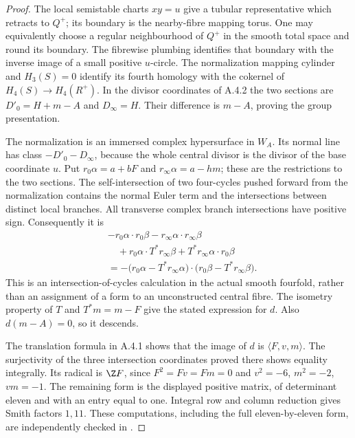 \begin{proof}
The local semistable charts $xy=u$ give a tubular representative which
retracts to $Q^+$; its boundary is the nearby-fibre mapping torus. One
may equivalently choose a regular neighbourhood of $Q^+$ in the smooth
total space and round its boundary. The fibrewise plumbing identifies
that boundary with the inverse image of a small positive $u$-circle.
The normalization mapping cylinder and $H_3(S)=0$ identify its fourth
homology with the cokernel of
$H_4(S)\to H_4(R^+)$. In the divisor coordinates of A.4.2 the two
sections are $D'_0=H+m-A$ and $D_\infty=H$. Their difference is
$m-A$, proving the group presentation.

The normalization is an immersed complex hypersurface in $W_A$.
Its normal line has class $-D'_0-D_\infty$, because the whole central
divisor is the divisor of the base coordinate $u$. Put
$r_0\alpha=a+bF$ and $r_\infty\alpha=a-hm$; these are the
restrictions to the two sections. The self-intersection of two
four-cycles pushed forward from the normalization contains the normal
Euler term and the intersections between distinct local branches.
All transverse complex branch intersections have positive sign.
Consequently it is
\begin{align*}
 &-r_0\alpha\cdot r_0\beta-r_\infty\alpha\cdot r_\infty\beta\\
 &\quad+r_0\alpha\cdot T^*r_\infty\beta
       +T^*r_\infty\alpha\cdot r_0\beta\\
 &=-\bigl(r_0\alpha-T^*r_\infty\alpha\bigr)
       \cdot\bigl(r_0\beta-T^*r_\infty\beta\bigr).
\end{align*}
This is an intersection-of-cycles calculation in the actual smooth
fourfold, rather than an assignment of a form to an unconstructed
central fibre. The isometry property of $T$ and $T^*m=m-F$ give
the stated expression for $d$. Also $d(m-A)=0$, so it descends.

The translation formula in A.4.1 shows that the image of $d$ is
$\langle F,v,m\rangle$. The surjectivity of the three intersection
coordinates proved there shows equality integrally. Its radical is
$\Z F$, since $F^2=Fv=Fm=0$ and
$v^2=-6$, $m^2=-2$, $vm=-1$. The remaining form is the displayed
positive matrix, of determinant eleven and with an entry equal to
one. Integral row and column reduction gives Smith factors $1,11$.
These computations, including the full eleven-by-eleven form, are
independently checked in .
\end{proof}

